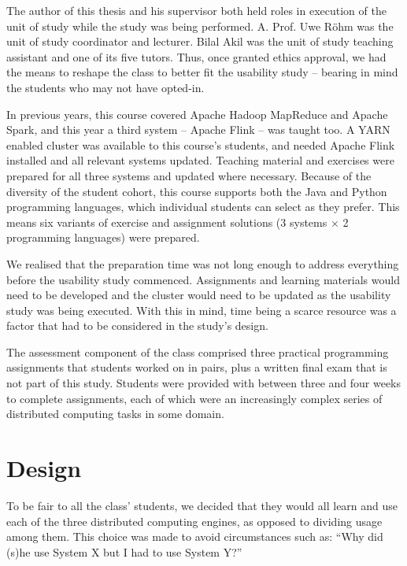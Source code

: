   The author of this thesis and his supervisor both held roles in execution of the unit of study while the study was being performed. A. Prof. Uwe R\"ohm was the unit of study coordinator and lecturer. Bilal Akil was the unit of study teaching assistant and one of its five tutors. Thus, once granted ethics approval, we had the means to reshape the class to better fit the usability study -- bearing in mind the students who may not have opted-in.

  In previous years, this course covered Apache Hadoop MapReduce and Apache Spark, and this year a third system -- Apache Flink -- was taught too. A YARN enabled cluster was available to this course's students, and needed Apache Flink installed and all relevant systems updated. Teaching material and exercises were prepared for all three systems and updated where necessary. Because of the diversity of the student cohort, this course supports both the Java and Python programming languages, which individual students can select as they prefer. This means six variants of exercise and assignment solutions (3 systems $\times$ 2 programming languages) were prepared.

  We realised that the preparation time was not long enough to address everything before the usability study commenced. Assignments and learning materials would need to be developed and the cluster would need to be updated as the usability study was being executed. With this in mind, time being a scarce resource was a factor that had to be considered in the study's design.

  The assessment component of the class comprised three practical programming assignments that students worked on in pairs, plus a written final exam that is not part of this study. Students were provided with between three and four weeks to complete assignments, each of which were an increasingly complex series of distributed computing tasks in some domain.


\section{Design}

  To be fair to all the class' students, we decided that they would all learn and use each of the three distributed computing engines, as opposed to dividing usage among them. This choice was made to avoid circumstances such as: ``Why did (s)he use System X but I had to use System Y?''
  
